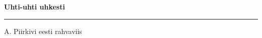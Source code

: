 \documentclass[10pt]{book}
\begin{document}
{
  \samepage
  \raggedbottom
  \raggedright
  \sloppy


  \vspace{0.2in}

  \noindent\begin{minipage}{.1\textwidth}
    \hfill\vspace{0.1in}
  \end{minipage}%
  \noindent\begin{minipage}{.8\textwidth}
    \centering
    \bfseries
    \large Uhti-uhti uhkesti
  \end{minipage}%
  \noindent\begin{minipage}{.1\textwidth}
      \hfill\vspace{0.1in}
  \end{minipage}

  \nopagebreak[4]
  \vspace{0.1in}
  \nopagebreak[4]
  \hrule height 0.05ex
  \nopagebreak[4]
  \vspace{-0.05in}

  {\footnotesize A. Piirkivi \hfill eesti rahvaviis }\\
  \vspace{0.01in}



}
\end{document}
